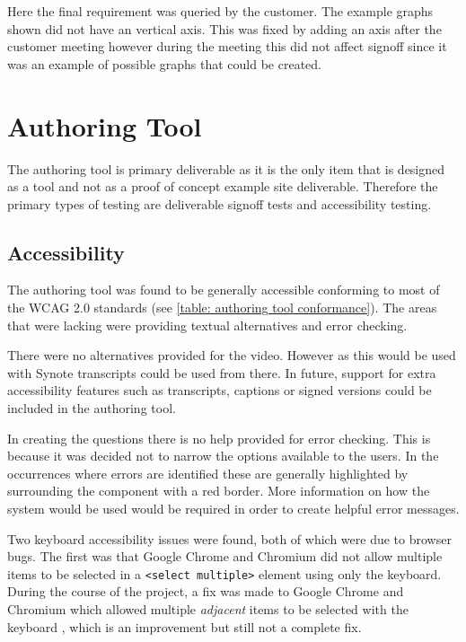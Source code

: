 Here the final requirement was queried by the customer. The example graphs shown did not have an vertical axis. This was fixed by adding an axis after the customer meeting however during the meeting this did not affect signoff since it was an example of possible graphs that could be created.

\section{Authoring Tool}

The authoring tool is primary deliverable as it is the only item that is designed as a tool and not as a proof of concept example site deliverable. Therefore the primary types of testing are deliverable signoff tests and accessibility testing.

\subsection{Accessibility}
\label{Section:Testing_Authoring_tool_accessibility}

The authoring tool was found to be generally accessible conforming to most of the \gls{WCAG} 2.0 standards (see \autoref{table: authoring tool conformance}). The areas that were lacking were providing textual alternatives and error checking.

There were no alternatives provided for the video. However as this would be used with Synote transcripts could be used from there. In future, support for extra accessibility features such as transcripts, captions or signed versions could be included in the authoring tool.

In creating the questions there is no help provided for error checking. This is because it was decided not to narrow the options available to the users. In the occurrences where errors are identified these are generally highlighted by surrounding the component with a red border. More information on how the system would be used would be required in order to create helpful error messages.

Two keyboard accessibility issues were found, both of which were due to browser bugs. The first was that Google Chrome and Chromium did not allow multiple items to be selected in a \texttt{\textless select multiple\textgreater} element using only the keyboard. During the course of the project, a fix was made to Google Chrome and Chromium which allowed multiple \textit{adjacent} items to be selected with the keyboard \citep{ChromiumMultipleSelectBug}, which is an improvement but still not a complete fix.

